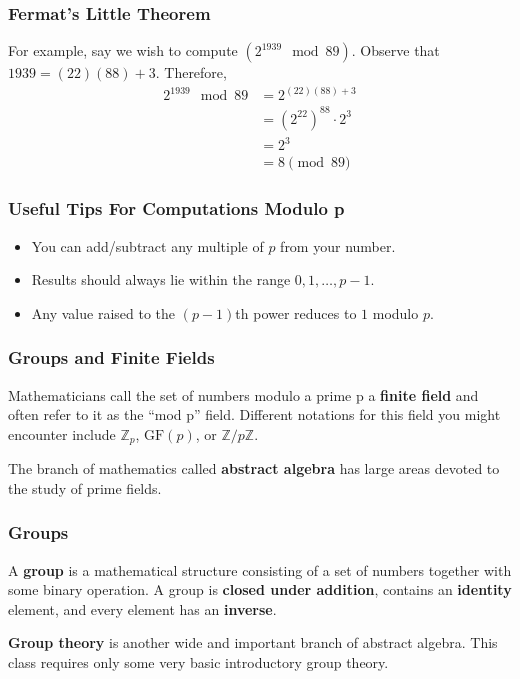 \documentclass{beamer}
\newcommand{\<}{\langle}
\renewcommand{\>}{\rangle}
\begin{document}
\begin{frame}
\frametitle{Fermat's Little Theorem}

For example, say we wish to compute $(2^{1939} \mod{89})$. Observe that $1939 = (22)(88) + 3$. Therefore, 
\begin{align*}
2^{1939} \mod{89} &= 2^{(22)(88) + 3} \\
	&= (2^{22})^{88}\cdot 2^{3} \\
	&= 2^{3} \\
	&= 8\pmod{89}
\end{align*}
\end{frame}



\begin{frame}
\frametitle{Useful Tips For Computations Modulo p}

\begin{itemize}
\item You can add/subtract any multiple of $p$ from your number.
\item Results should always lie within the range $0, 1, \dots, p-1$.
\item Any value raised to the $(p-1)$th power reduces to $1$ modulo $p$.
\end{itemize}
\end{frame}


\begin{frame}
\frametitle{Groups and Finite Fields}

Mathematicians call the set of numbers modulo a prime p a \textbf{finite field} and
often refer to it as the ``mod p'' field. Different notations for this field you might encounter include $\mathbb{Z}_p$, $\mathrm{GF}(p)$, or $\mathbb{Z}/p\mathbb{Z}$.\newline 

The branch of mathematics called \textbf{abstract algebra} has large areas devoted to the study of prime fields.
\end{frame}


\begin{frame}
\frametitle{Groups}

A \textbf{group} is a mathematical structure consisting of a set of numbers together with some binary operation. A group is \textbf{closed under addition}, contains an \textbf{identity} element, and every element has an \textbf{inverse}. \newline

\textbf{Group theory} is another wide and important branch of abstract algebra. This class requires only some very basic introductory group theory.
\end{frame}
\end{document}
